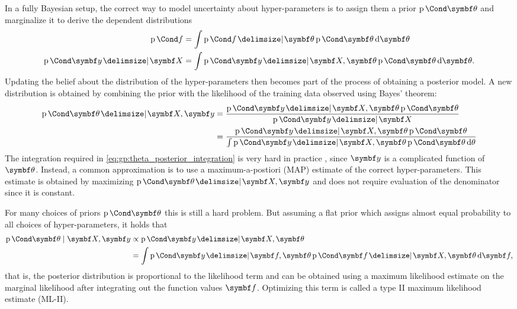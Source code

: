 In a fully Bayesian setup, the correct way to model uncertainty about hyper-parameters is to assign them a prior $\Prob{\mat{\theta}}$ and marginalize it to derive the dependent distributions
\begin{align}
    \Prob{f}                      & = \int \Prob{f \given \mat{\theta}} \Prob{\mat{\theta}} \diff \mat{\theta}                                                           \\
    \Prob{\mat{y} \given \mat{X}} & = \int \Prob{\mat{y} \given \mat{X}, \mat{\theta}} \Prob{\mat{\theta}} \diff \mat{\theta}. \label{eq:gp:theta_posterior_integration}
\end{align}
Updating the belief about the distribution of the hyper-parameters then becomes part of the process of obtaining a posterior model.
A new distribution is obtained by combining the prior with the likelihood of the training data observed using Bayes' theorem:
\begin{align}
    \begin{split}
        \Prob{\mat{\theta} \given \mat{X}, \mat{y}} &= \frac{\Prob{\mat{y} \given \mat{X}, \mat{\theta}} \Prob{\mat{\theta}}}{\Prob{\mat{y} \given \mat{X}}} \\
        &= \frac{\Prob{\mat{y} \given \mat{X}, \mat{\theta}} \Prob{\mat{\theta}}}{\int \Prob{\mat{y} \given \mat{X}, \mat{\theta}} \Prob{\mat{\theta}} \diff \theta}
    \end{split}
\end{align}
The integration required in \cref{eq:gp:theta_posterior_integration} is very hard in practice \cite{rasmussen_gaussian_2006}, since $\mat{y}$ is a complicated function of $\mat{\theta}$.
Instead, a common approximation is to use a maximum-a-postiori (MAP) estimate of the correct hyper-parameters.
This estimate is obtained by maximizing $\Prob{\mat{\theta} \given \mat{X}, \mat{y}}$ and does not require evaluation of the denominator since it is constant.

For many choices of priors $\Prob{\mat{\theta}}$ this is still a hard problem.
But assuming a flat prior which assigns almost equal probability to all choices of hyper-parameters, it holds that
\begin{align}
    \begin{split}
        \Prob{\mat{\theta} \mid \mat{X}, \mat{y}} &\propto \Prob{\mat{y} \given \mat{X}, \mat{\theta}} \\
        &= \int \Prob{\mat{y} \given \mat{f}, \mat{\theta}} \Prob{\mat{f} \given \mat{X}, \mat{\theta}} \diff \mat{f},
    \end{split}
\end{align}
that is, the posterior distribution is proportional to the likelihood term and can be obtained using a maximum likelihood estimate on the marginal likelihood after integrating out the function values $\mat{f}$.
Optimizing this term is called a type II maximum likelihood estimate (ML-II).

